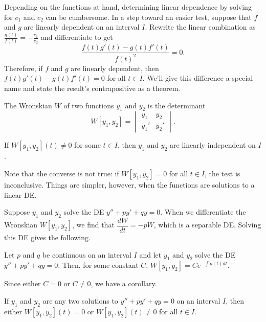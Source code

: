 \documentclass[../m82main.tex]{chapters}
\begin{document}
Depending on the functions at hand, determining linear dependence by solving for $c_1$ and $c_2$ can be cumbersome.
In a step toward an easier test, suppose that $f$ and $g$ are linearly dependent on an interval $I$.
Rewrite the linear combination as $\displaystyle \frac{g(t)}{f(t)} = -\frac{c_1}{c_2}$ and differentiate to get
\[ \frac{f(t)g'(t) - g(t)f'(t)}{f(t)^2} = 0. \]
Therefore, if $f$ and $g$ are linearly dependent, then $f(t)g'(t) - g(t)f'(t) = 0$ for all $t \in I$.
We'll give this difference a special name and state the result's contrapositive as a theorem.

\begin{definition}[Wronskian]
    The Wronskian $W$ of two functions $y_1$ and $y_2$ is the determinant
    \[ W[y_1, y_2] = \begin{vmatrix} y_1 & y_2 \\ y_1' & y_2' \end{vmatrix}. \]
\end{definition}

\begin{theorem}
    If $W[y_1, y_2](t) \neq 0$ for some $t \in I$, then $y_1$ and $y_2$ are linearly independent on $I$.
\end{theorem}

Note that the converse is not true: if $W[y_1, y_2] = 0$ for all $t \in I$, the test is inconclusive.
Things are simpler, however, when the functions are solutions to a linear DE.

Suppose $y_1$ and $y_2$ solve the DE $y'' + py' + qy = 0$.
When we differentiate the Wronskian $W[y_1, y_2]$, we find that $\dfrac{dW}{dt} = -pW$, which is a separable DE.
Solving this DE gives the following.

\begin{theorem}
    Let $p$ and $q$ be continuous on an interval $I$ and let $y_1$ and $y_2$ solve the DE $y'' + py' + qy = 0$.
    Then, for some constant $C$, $W[y_1, y_2] = Ce^{-\int p(t) dt}$.
\end{theorem}

Since either $C = 0$ or $C \neq 0$, we have a corollary.

\begin{corollary}[$W(t_0) = 0$ implies identially zero]
    If $y_1$ and $y_2$ are any two solutions to $y'' + py' + qy = 0$ on an interval $I$, then either $W[y_1, y_2](t) = 0$ or $W[y_1, y_2](t) \neq 0$ for all $t \in I$.
\end{corollary}
\end{document}
